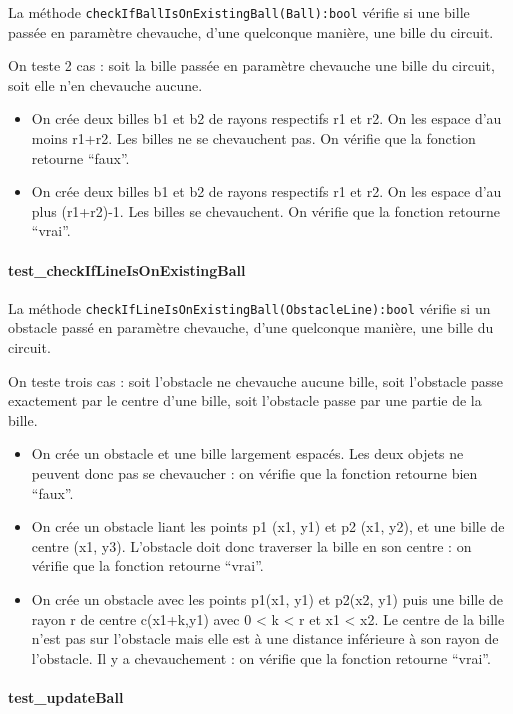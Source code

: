 \documentclass{report}
\begin{document}
La méthode \texttt{checkIfBallIsOnExistingBall(Ball):bool} vérifie si une bille passée en paramètre chevauche, d’une quelconque manière, une bille du circuit.

On teste 2 cas : soit la bille passée en paramètre chevauche une bille du circuit, soit elle n’en chevauche aucune.

\begin{itemize}
\item On crée deux billes b1 et b2 de rayons respectifs r1 et r2. On les espace d’au moins r1+r2. Les billes ne se chevauchent pas. On vérifie que la fonction retourne “faux”.
\item On crée deux billes b1 et b2 de rayons respectifs r1 et r2. On les espace d’au plus (r1+r2)-1. Les billes se chevauchent. On vérifie que la fonction retourne “vrai”.
\end{itemize}

\paragraph{test\_checkIfLineIsOnExistingBall}

La méthode \texttt{checkIfLineIsOnExistingBall(ObstacleLine):bool} vérifie si un obstacle passé en paramètre chevauche, d’une quelconque manière, une bille du circuit.

On teste trois cas : soit l’obstacle ne chevauche aucune bille, soit l’obstacle passe exactement par le centre d’une bille, soit l’obstacle passe par une partie de la bille.

\begin{itemize}
\item On crée un obstacle et une bille largement espacés. Les deux objets ne peuvent donc pas se chevaucher : on vérifie que la fonction retourne bien “faux”.
\item On crée un obstacle liant les points p1 (x1, y1) et p2 (x1, y2), et une bille de centre (x1, y3). L’obstacle doit donc traverser la bille en son centre : on vérifie que la fonction retourne “vrai”.
\item On crée un obstacle avec les points p1(x1, y1) et p2(x2, y1) puis une bille de rayon r de centre c(x1+k,y1) avec 0 < k < r et x1 < x2. Le centre de la bille n’est pas sur l’obstacle mais elle est à une distance inférieure à son rayon de l’obstacle. Il y a chevauchement : on vérifie que la fonction retourne “vrai”.
\end{itemize}

\paragraph{test\_updateBall}
\end{document}
